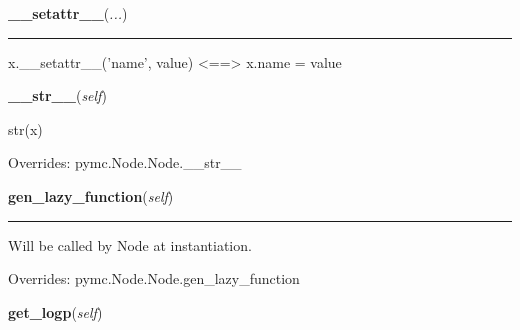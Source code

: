     \begin{boxedminipage}{\textwidth}

    \raggedright \textbf{\_\_setattr\_\_}(\textit{...})

    \vspace{-1.5ex}

    \rule{\textwidth}{0.5\fboxrule}
    x.\_\_setattr\_\_('name', value) {\textless}=={\textgreater} x.name = 
    value

    \vspace{1ex}

    \end{boxedminipage}

    \vspace{0.5ex}

    \begin{boxedminipage}{\textwidth}

    \raggedright \textbf{\_\_str\_\_}(\textit{self})

    str(x)

    \vspace{1ex}

      Overrides: pymc.Node.Node.\_\_str\_\_

    \end{boxedminipage}

    \vspace{0.5ex}

    \begin{boxedminipage}{\textwidth}

    \raggedright \textbf{gen\_lazy\_function}(\textit{self})

    \vspace{-1.5ex}

    \rule{\textwidth}{0.5\fboxrule}

Will be called by Node at instantiation.
    \vspace{1ex}

      Overrides: pymc.Node.Node.gen\_lazy\_function

    \end{boxedminipage}

    \label{pymc:PyMCObjects:Stochastic:get_logp}

    \vspace{0.5ex}

    \begin{boxedminipage}{\textwidth}

    \raggedright \textbf{get\_logp}(\textit{self})

    \end{boxedminipage}

